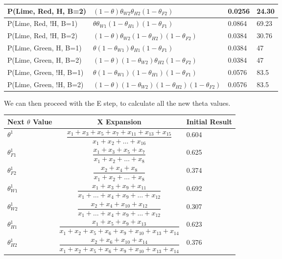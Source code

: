 \documentclass[12pt]{article}
\newenvironment{problem}[2][Problem]{\begin{trivlist}
\item[\hskip \labelsep {\bfseries #1}\hskip \labelsep {\bfseries #2.}]}{\end{trivlist}}
\begin{document}
\begin{problem}{1}
\begin{tabular}{|l|l|l|l|}
        P(Lime, Red, H, B=2)      & $ (1-\theta) \theta_{W2} \theta_{H2}(1-\theta_{F2})$                      & 0.0256 & 24.30\\ \hline
        P(Lime, Red, !H, B=1)     & $ \theta \theta_{W1} (1-\theta_{H1})     (1-\theta_{F1})$                 & 0.0864 & 69.23\\ \hline
        P(Lime, Red, !H, B=2)     & $ (1-\theta) \theta_{W2} (1-\theta_{H2}) (1-\theta_{F2})$                 & 0.0384 & 30.76\\ \hline
        P(Lime, Green, H, B=1)    & $ \theta (1-\theta_{W1}) \theta_{H1}    (1-\theta_{F1})$                  & 0.0384 & 47\\ \hline
        P(Lime, Green, H, B=2)    & $ (1-\theta) (1-\theta_{W2}) \theta_{H2} (1-\theta_{F2})$                 & 0.0384 & 47\\ \hline
        P(Lime, Green, !H, B=1)   & $ \theta (1-\theta_{W1}) (1-\theta_{H1})(1-\theta_{F1})$                  & 0.0576 & 83.5\\ \hline
        P(Lime, Green, !H, B=2)   & $ (1-\theta) (1-\theta_{W2}) (1-\theta_{H2})(1-\theta_{F2})$              & 0.0576 & 83.5\\ \hline
    \end{tabular}

    We can then proceed with the E step, to calculate all the new theta values.

\begin{tabular}{|l|c|l|}
        \hline
        Next $\theta$ Value & X Expansion & Initial Result\\
        \hline
        \hline
        $ \theta^1 $      & $\dfrac{x_1 + x_3 + x_5 + x_7 + x_{11} + x_{13} + x_{15}}{x_1+x_2+\dots+x_{16}}$ & 0.604\\ \hline
        $ \theta_{F1}^1 $ & $\dfrac{x_1+x_3 + x_5+x_7 }{x_1+x_2+\dots+x_{8} }$                               & 0.625\\ \hline
        $ \theta_{F2}^1 $ & $\dfrac{x_2+x_4+x_8}{ x_1+x_2+\dots+x_{8}}$                                      & 0.374\\ \hline
        $ \theta_{W1}^1 $ & $\dfrac{x_1+x_3+x_9+x_{11} }{x_1 +\dots+x_4 + x_9+\dots+x_{12} }$                & 0.692\\ \hline
        $ \theta_{W2}^1 $ & $\dfrac{x_2+x_4+x_{10}+x_{12} }{x_1 +\dots+x_4 + x_9+\dots+x_{12} }$             & 0.307\\ \hline
        $ \theta_{H1}^1 $ & $\dfrac{x_1+x_5+x_9+x_{13} }{ x_1+x_2+x_5+x_6+x_9+x_{10}+x_{13}+x_{14}}$         & 0.623\\ \hline
        $ \theta_{H2}^1 $ & $\dfrac{x_2+x_6+x_{10} + x_{14}}{x_1+x_2+x_5+x_6+x_9+x_{10}+x_{13}+x_{14} }$     & 0.376\\ \hline
    \end{tabular}


\end{problem}
\end{document}
